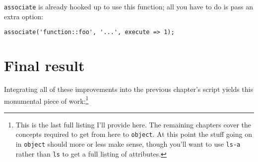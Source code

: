 \documentclass{report}
\begin{document}
      {\tt associate} is already hooked up to use this function; all you have to do is pass an extra option:

\begin{verbatim}
associate('function::foo', '...', execute => 1);
\end{verbatim}

\section{Final result}\label{sec:some-improvements-final-result}
    Integrating all of these improvements into the previous chapter's script yields this monumental piece of work:\footnote{This is the last full listing I'll provide here. The remaining
    chapters cover the concepts required to get from here to {\tt object}. At this point the stuff going on in {\tt object} should more or less make sense, though you'll want to use {\tt ls-a}
    rather than {\tt ls} to get a full listing of attributes.}
\end{document}
